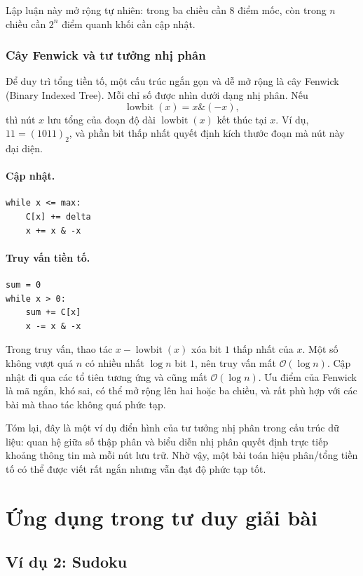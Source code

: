 \documentclass[11pt]{article}
\newcommand{\Oh}{\mathcal{O}}
\newcommand{\lowbit}{\operatorname{lowbit}}
\begin{document}
Lập luận này mở rộng tự nhiên: trong ba chiều cần \(8\) điểm mốc, còn trong
\(n\) chiều cần \(2^n\) điểm quanh khối cần cập nhật.

\subsubsection{Cây Fenwick và tư tưởng nhị phân}

Để duy trì tổng tiền tố, một cấu trúc ngắn gọn và dễ mở rộng là cây Fenwick
(Binary Indexed Tree). Mỗi chỉ số được nhìn dưới dạng nhị phân. Nếu
\[
  \lowbit(x)=x\mathbin{\&}(-x),
\]
thì nút \(x\) lưu tổng của đoạn độ dài \(\lowbit(x)\) kết thúc tại \(x\).
Ví dụ, \(11=(1011)_2\), và phần bit thấp nhất quyết định kích thước đoạn mà
nút này đại diện.

\paragraph{Cập nhật.}
\begin{verbatim}
while x <= max:
    C[x] += delta
    x += x & -x
\end{verbatim}

\paragraph{Truy vấn tiền tố.}
\begin{verbatim}
sum = 0
while x > 0:
    sum += C[x]
    x -= x & -x
\end{verbatim}

Trong truy vấn, thao tác \(x-\lowbit(x)\) xóa bit \(1\) thấp nhất của \(x\).
Một số không vượt quá \(n\) có nhiều nhất \(\log n\) bit \(1\), nên truy vấn
mất \(\Oh(\log n)\). Cập nhật đi qua các tổ tiên tương ứng và cũng mất
\(\Oh(\log n)\). Ưu điểm của Fenwick là mã ngắn, khó sai, có thể mở rộng lên
hai hoặc ba chiều, và rất phù hợp với các bài mà thao tác không quá phức tạp.

Tóm lại, đây là một ví dụ điển hình của tư tưởng nhị phân trong cấu trúc dữ
liệu: quan hệ giữa số thập phân và biểu diễn nhị phân quyết định trực tiếp
khoảng thông tin mà mỗi nút lưu trữ. Nhờ vậy, một bài toán hiệu phân/tổng
tiền tố có thể được viết rất ngắn nhưng vẫn đạt độ phức tạp tốt.

\section{Ứng dụng trong tư duy giải bài}

\subsection{Ví dụ 2: Sudoku}
\end{document}
